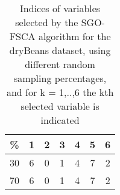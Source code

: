 \begin{table}
	\begin{center}
		\begin{tabular}{c c c c c c c}
			\% & 1 & 2 & 3 & 4 & 5 & 6 \\
			\hline
			30 & 6 & 0 & 1 & 4 & 7 & 2 \\
			70 & 6 & 0 & 1 & 4 & 7 & 2 \\
		\end{tabular}
	\end{center}
	\caption{Indices of variables selected by the SGO-FSCA algorithm for the dryBeans dataset, using different random sampling percentages, and for k = 1,..,6 the kth selected variable is indicated}
\end{table}
